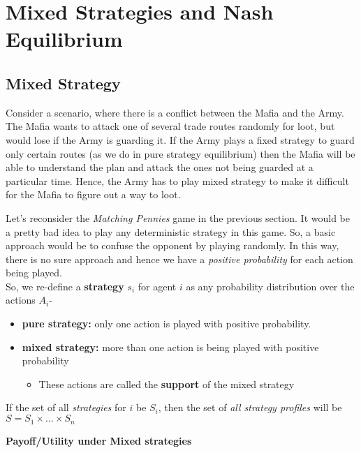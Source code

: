 \section{Mixed Strategies and Nash Equilibrium}

\subsection{Mixed Strategy}
\hspace{1cm}Consider a scenario, where there is a conflict between the Mafia and the Army. The Mafia wants to attack one of several trade routes randomly for loot, but would lose if the Army is guarding it. If the Army plays a fixed strategy to guard only certain routes (as we do in pure strategy equilibrium) then the Mafia will be able to understand the plan and attack the ones not being guarded at a particular time. Hence, the Army has to play mixed strategy to make it difficult for the Mafia to figure out a way to loot.\newline

Let's reconsider the \textit{Matching Pennies} game in the previous section. It would be a pretty bad idea to play any deterministic strategy in this game. So, a basic approach would be to confuse the opponent by playing randomly. In this way, there is no sure approach and hence we have a \textit{positive probability} for each action being played.\\

 So, we re-define a \textbf{strategy} $s_i$ for agent $i$ as any  probability distribution over the actions $A_i$-
 \begin{itemize}
 \item \textbf{pure strategy:} only one action is played with positive probability.
 \item \textbf{mixed strategy:} more than one action is being played with positive probability
 	\begin{itemize}
	\item These actions are called the \textbf{support} of the mixed strategy
	\end{itemize}
 \end{itemize}
 
 If the set of all \textit{strategies} for $i$ be $S_i$, then the set of \textit{all strategy profiles }will be $S = S_1 \times \dots \times S_n$\newline
 
\textbf{Payoff/Utility under Mixed strategies}\\


